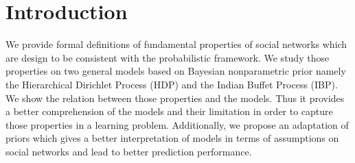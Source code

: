 \section{Introduction}

We provide formal definitions of fundamental properties of social networks which are design to be consistent with the probabilistic framework. We study those properties on two general models based on Bayesian nonparametric prior namely the Hierarchical Dirichlet Process (HDP) and the Indian Buffet Process (IBP). We show the relation between those properties and the models. Thus it provides a better comprehension of the models and their limitation in order to capture those properties in a learning problem. Additionally, we propose an adaptation of priors which gives a better interpretation of models in terms of assumptions on social networks and lead to better prediction performance.

